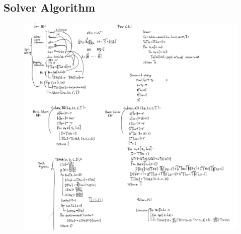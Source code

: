 \documentclass[12pt]{article}
\begin{document}
\subsection{Solver Algorithm}
\begin{figure}[H] 
\centering 
\includegraphics[scale=0.3]{Solver Algorithm.jpg} 
\end{figure}
\end{document}
